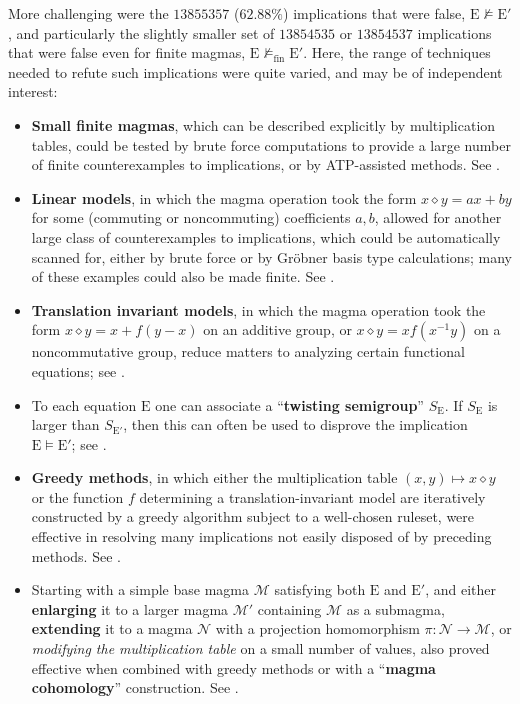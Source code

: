 \documentclass[12pt]{amsart}
\theoremstyle{definition}
\newcommand{\op}{\diamond}
\newcommand{\nmodels}{\not\models}
\newcommand{\nmodelsfin}{\nmodels_{\mathrm{fin}}}
\newcommand{\Magma}{{\mathcal{M}}}
\newcommand{\MagmaN}{{\mathcal{N}}}
\newcommand{\E}{\mathrm{E}}
\begin{document}
More challenging were the $\num{13855357}$ ($62.88\%$) implications that were false, $\E \nmodels {\E'}$, and particularly the slightly smaller set of $\num{13854535}$ or $\num{13854537}$ implications that were false even for finite magmas, $\E \nmodelsfin {\E'}$. Here, the range of techniques needed to refute such implications were quite varied, and may be of independent interest:
\begin{itemize}
        \item \textbf{Small finite magmas}, which can be described explicitly by multiplication tables, could be tested by brute force computations to provide a large number of finite counterexamples to implications, or by ATP-assisted methods. See .
        \item \textbf{Linear models}, in which the magma operation took the form $x \op y = ax + by$ for some (commuting or noncommuting) coefficients $a,b$, allowed for another large class of counterexamples to implications, which could be automatically scanned for, either by brute force or by Gr\"obner basis type calculations; many of these examples could also be made finite. See .
        \item \textbf{Translation invariant models}, in which the magma operation took the form $x \op y = x + f(y-x)$ on an additive group, or $x \op y = x f(x^{-1} y)$ on a noncommutative group, reduce matters to analyzing certain functional equations; see .
        \item To each equation $\E$ one can associate a ``\textbf{twisting semigroup}'' $S_{\E}$.  If $S_{\E}$ is larger than $S_{{\E'}}$, then this can often be used to disprove the implication ${\E} \models {\E'}$; see .
        \item \textbf{Greedy methods}, in which either the multiplication table $(x,y) \mapsto x \op y$ or the function $f$ determining a translation-invariant model are iteratively constructed by a greedy algorithm subject to a well-chosen ruleset, were effective in resolving many implications not easily disposed of by preceding methods. See .
        \item Starting with a simple base magma $\Magma$ satisfying both $\E$ and ${\E'}$, and either \textbf{enlarging} it to a larger magma $\Magma'$ containing $\Magma$ as a submagma, \textbf{extending} it to a magma $\MagmaN$ with a projection homomorphism $\pi: \MagmaN \to \Magma$, or \emph{modifying the multiplication table} on a small number of values, also proved effective when combined with greedy methods or with a ``\textbf{magma cohomology}'' construction. See .

\end{itemize}
\end{document}
